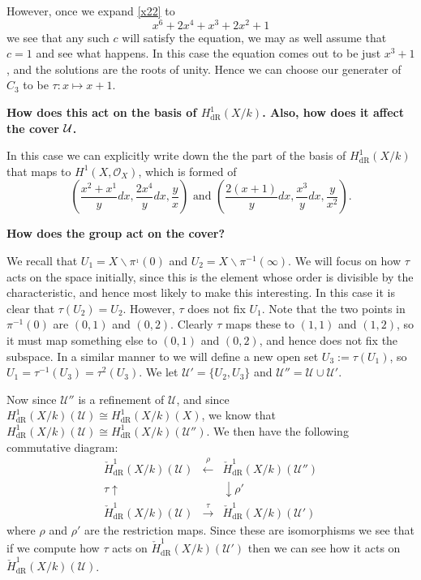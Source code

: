 \documentclass[draft, 11pt]{article} %
\theoremstyle{plain}
\theoremstyle{remark}
\newcommand{\cU}{{\mathcal U}}
\newcommand{\hone}{H^1(X,\mathcal{O}_X)}
\newcommand{\derhamhone}{H_{\text {dR}}^1(X/k)}
\newcommand{\cechderhamhone}{\check{H}_{\text {dR}}^1(X/k)}
\begin{document}
However, once we expand \eqref{x22} to 
\begin{equation}
x^6 + 2x^4 + x^3 + 2x^2 + 1
\end{equation}
we see that any such $c$ will satisfy the equation, we may as well assume that $c=1$ and see what happens.
In this case the equation comes out to be just $x^3+1$, and the solutions are the roots of unity.
Hence we can choose our generater of $C_3$ to be $\tau \colon x \mapsto x+1$.


{\bf How does this act on the basis of $\derhamhone$. Also, how does it affect the cover $\cal U$.}

In this case we can explicitly write down the the part of the basis of $\derhamhone$ that maps to $\hone$, which is formed of
\[
\left( \frac{x^2+x^1}{y} dx, \frac{2x^4}{y} dx, \frac{y}{x} \right) \text{ and } \left( \frac{2(x + 1)}{y} dx, \frac{x^3}{y} dx, \frac{y}{x^2} \right).
\]

{\bf How does the group act on the cover?}

We recall that $U_1 = X \backslash \pi^{_1}(0)$ and $U_2 = X \backslash \pi^{-1}(\infty)$.
We will focus on how $\tau$ acts on the space initially, since this is the element whose order is divisible by the characteristic, and hence most likely to make this interesting.
In this case it is clear that $\tau(U_2) = U_2$.
However, $\tau$ does not fix $U_1$. 
Note that the two points in $\pi^{-1}(0)$ are $(0,1)$ and $(0,2)$.
Clearly $\tau$ maps these to $(1,1)$ and $(1,2)$, so it must map something else to $(0,1)$ and $(0,2)$, and hence does not fix the subspace.
In a similar manner to \cite{canonicalrepresentation} we will define a new open set $U_3 := \tau(U_1)$, so $U_1 = \tau^{-1}(U_3) = \tau^2(U_3)$.
We let $\mathcal U' = \{ U_2, U_3\}$ and $\mathcal U'' = \mathcal U \cup \mathcal U'$.

Now since $\mathcal U''$ is a refinement of $\mathcal U$, and since $\derhamhone (\mathcal U) \cong \derhamhone (X)$, we know that $\derhamhone (\mathcal U) \cong \derhamhone (\cU'')$.
We then have the following commutative diagram:
\[
\begin{array}{ccc}
\cechderhamhone (\cU) & \overset{\rho}{\leftarrow} & \cechderhamhone (\cU'') \\
\tau \uparrow & & \downarrow  \rho' \\
\cechderhamhone(\cU) & \overset{\tau}{\rightarrow} & \cechderhamhone(\cU')
\end{array}
\]
where $\rho$ and $\rho'$ are the restriction maps.
Since these are isomorphisms we see that if we compute how $\tau$ acts on $\cechderhamhone (\cU')$ then we can see how it acts on $\cechderhamhone(\cU)$.
\end{document}
